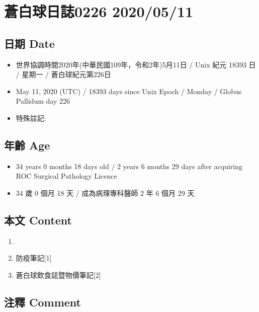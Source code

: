 \documentclass[
]{article}
\providecommand{\tightlist}{%
  \setlength{\itemsep}{0pt}\setlength{\parskip}{0pt}}
\begin{document}
\hypertarget{ux84bcux767dux7403ux65e5ux8a8c0226-20200511}{%
\section{蒼白球日誌0226
2020/05/11}\label{ux84bcux767dux7403ux65e5ux8a8c0226-20200511}}

\hypertarget{ux65e5ux671f-date-10}{%
\subsection{日期 Date}\label{ux65e5ux671f-date-10}}

\begin{itemize}
\tightlist
\item
  世界協調時間2020年(中華民國109年，令和2年)5月11日 / Unix 紀元 18393 日
  / 星期一 / 蒼白球紀元第226日
\item
  May 11, 2020 (UTC) / 18393 days since Unix Epoch / Monday / Globus
  Pallidum day 226
\item
  特殊註記:
\end{itemize}

\hypertarget{ux5e74ux9f61-age-10}{%
\subsection{年齡 Age}\label{ux5e74ux9f61-age-10}}

\begin{itemize}
\tightlist
\item
  34 years 0 months 18 days old / 2 years 6 months 29 days after
  acquiring ROC Surgical Pathology Licence
\item
  34 歲 0 個月 18 天 / 成為病理專科醫師 2 年 6 個月 29 天
\end{itemize}

\hypertarget{ux672cux6587-content-10}{%
\subsection{本文 Content}\label{ux672cux6587-content-10}}

\begin{enumerate}
\def\labelenumi{\arabic{enumi}.}
\item
\item
  防疫筆記{[}1{]}
\item
  蒼白球飲食誌暨物價筆記{[}2{]}
\end{enumerate}

\hypertarget{ux6ce8ux91cb-comment-10}{%
\subsection{注釋 Comment}\label{ux6ce8ux91cb-comment-10}}
\end{document}
